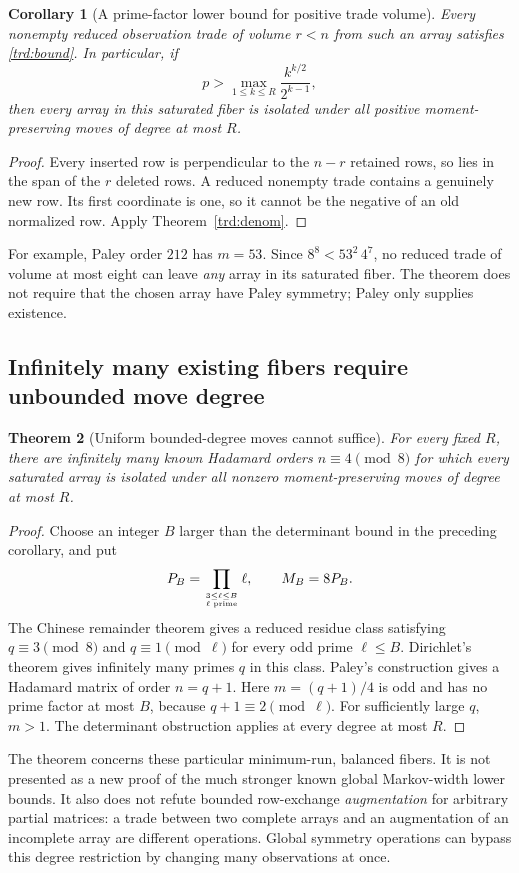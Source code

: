 \documentclass[11pt]{article}
\newtheorem{theorem}{Theorem}[section]
\newtheorem{corollary}[theorem]{Corollary}
\begin{document}
\begin{corollary}[A prime-factor lower bound for positive trade volume]
Every nonempty reduced observation trade of volume $r<n$ from such an
array satisfies \eqref{trd:bound}. In particular, if
\[
 p>\max_{1\le k\le R}\frac{k^{k/2}}{2^{k-1}},
\]
then every array in this saturated fiber is isolated under all positive
moment-preserving moves of degree at most $R$.
\end{corollary}
\begin{proof}
Every inserted row is perpendicular to the $n-r$ retained rows, so lies
in the span of the $r$ deleted rows. A reduced nonempty trade contains
a genuinely new row. Its first coordinate is one, so it cannot be the
negative of an old normalized row. Apply Theorem~\ref{trd:denom}.
\end{proof}
For example, Paley order $212$ has $m=53$. Since
$8^8<53^2\,4^7$, no reduced trade of volume at most eight can leave
\emph{any} array in its saturated fiber. The theorem does not require
that the chosen array have Paley symmetry; Paley only supplies existence.

\subsection{Infinitely many existing fibers require unbounded move degree}
\begin{theorem}[Uniform bounded-degree moves cannot suffice]\label{trd:unbounded}
For every fixed $R$, there are infinitely many known Hadamard orders
$n\equiv4\pmod8$ for which every saturated array is isolated under all
nonzero moment-preserving moves of degree at most $R$.
\end{theorem}
\begin{proof}
Choose an integer $B$ larger than the determinant bound in the preceding
corollary, and put
\[
 P_B=\prod_{3\le\ell\le B\atop\ell\text{ prime}}\ell,
 \qquad M_B=8P_B.
\]
The Chinese remainder theorem gives a reduced residue class satisfying
$q\equiv3\pmod8$ and $q\equiv1\pmod\ell$ for every odd prime
$\ell\le B$. Dirichlet's theorem gives infinitely many primes $q$ in
this class. Paley's construction gives a Hadamard matrix of order
$n=q+1$. Here $m=(q+1)/4$ is odd and has no prime factor at most $B$,
because $q+1\equiv2\pmod\ell$. For sufficiently large $q$, $m>1$.
The determinant obstruction applies at every degree at most $R$.
\end{proof}

The theorem concerns these particular minimum-run, balanced fibers. It
is not presented as a new proof of the much stronger known global
Markov-width lower bounds. It also does not refute bounded row-exchange
\emph{augmentation} for arbitrary partial matrices: a trade between two
complete arrays and an augmentation of an incomplete array are different
operations. Global symmetry operations can bypass this degree restriction
by changing many observations at once.
\end{document}
